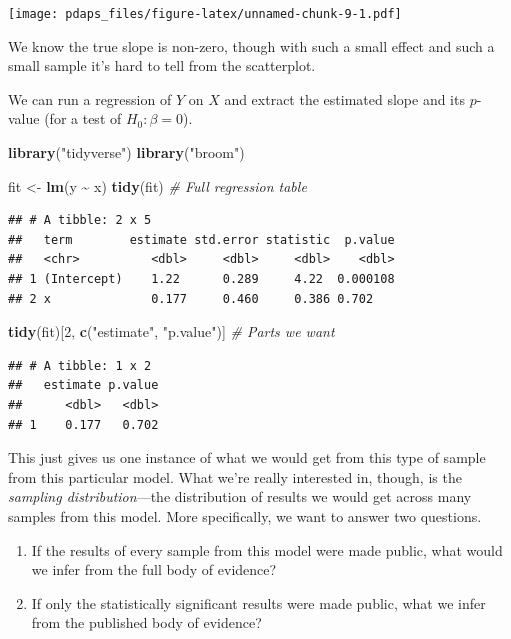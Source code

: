 \documentclass[
  12pt,
  oneside,openany]{book}
\newenvironment{Shaded}{\begin{snugshade}}{\end{snugshade}}
\newcommand{\CommentTok}[1]{\textcolor[rgb]{0.56,0.35,0.01}{\textit{#1}}}
\newcommand{\DecValTok}[1]{\textcolor[rgb]{0.00,0.00,0.81}{#1}}
\newcommand{\KeywordTok}[1]{\textcolor[rgb]{0.13,0.29,0.53}{\textbf{#1}}}
\newcommand{\NormalTok}[1]{#1}
\newcommand{\OperatorTok}[1]{\textcolor[rgb]{0.81,0.36,0.00}{\textbf{#1}}}
\newcommand{\StringTok}[1]{\textcolor[rgb]{0.31,0.60,0.02}{#1}}
\begin{document}
\texttt{[image: pdaps\_files/figure-latex/unnamed-chunk-9-1.pdf]}

We know the true slope is non-zero, though with such a small effect and such a small sample it's hard to tell from the scatterplot.

We can run a regression of \(Y\) on \(X\) and extract the estimated slope and its \(p\)-value (for a test of \(H_0 : \beta = 0\)).

\begin{Shaded}
\begin{Highlighting}[]
\KeywordTok{library}\NormalTok{(}\StringTok{"tidyverse"}\NormalTok{)}
\KeywordTok{library}\NormalTok{(}\StringTok{"broom"}\NormalTok{)}

\NormalTok{fit <{-}}\StringTok{ }\KeywordTok{lm}\NormalTok{(y }\OperatorTok{\textasciitilde{}}\StringTok{ }\NormalTok{x)}
\KeywordTok{tidy}\NormalTok{(fit)  }\CommentTok{\# Full regression table}
\end{Highlighting}
\end{Shaded}

\begin{verbatim}
## # A tibble: 2 x 5
##   term        estimate std.error statistic  p.value
##   <chr>          <dbl>     <dbl>     <dbl>    <dbl>
## 1 (Intercept)    1.22      0.289     4.22  0.000108
## 2 x              0.177     0.460     0.386 0.702
\end{verbatim}

\begin{Shaded}
\begin{Highlighting}[]
\KeywordTok{tidy}\NormalTok{(fit)[}\DecValTok{2}\NormalTok{, }\KeywordTok{c}\NormalTok{(}\StringTok{"estimate"}\NormalTok{, }\StringTok{"p.value"}\NormalTok{)]  }\CommentTok{\# Parts we want}
\end{Highlighting}
\end{Shaded}

\begin{verbatim}
## # A tibble: 1 x 2
##   estimate p.value
##      <dbl>   <dbl>
## 1    0.177   0.702
\end{verbatim}

This just gives us one instance of what we would get from this type of sample from this particular model. What we're really interested in, though, is the \emph{sampling distribution}---the distribution of results we would get across many samples from this model. More specifically, we want to answer two questions.

\begin{enumerate}
\def\labelenumi{\arabic{enumi}.}
\item
  If the results of every sample from this model were made public, what would we infer from the full body of evidence?
\item
  If only the statistically significant results were made public, what we infer from the published body of evidence?
\end{enumerate}
\end{document}
